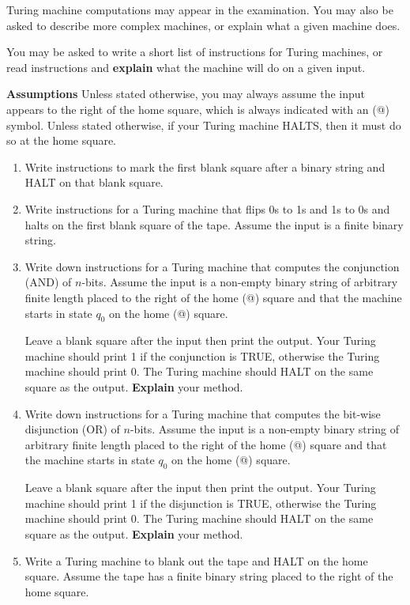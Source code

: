 \documentclass[11pt]{report}
\begin{document}
Turing machine computations may appear in the examination. You may also be asked to describe more complex machines, or explain what a given machine does. 

\vspace{0.3cm}

You may be asked to write a short list of instructions for Turing machines, or read instructions and {\bf explain} what the machine will do on a given input. 

\vspace{0.3cm}
{\bf Assumptions} Unless stated otherwise, you may always assume the input appears to the right of the home square, which is always indicated with an (@) symbol. Unless stated otherwise, if your Turing machine HALTS, then it must do so at the home square. 

\begin{enumerate}
	\item Write instructions to mark the first blank square after a binary string and HALT on that blank square.
	
	\item Write instructions for a Turing machine that flips 0s to 1s and 1s to 0s and halts on the first blank square of the tape. Assume the input is a finite binary string.
	
	\item Write down instructions for a Turing machine that computes the conjunction (AND) of $n$-bits. Assume the input is a non-empty binary string of arbitrary finite length placed to the right of the home (@) square and that the machine starts in state $q_{0}$ on the home (@) square.
		
	\vspace{0.1cm}

	Leave a blank square after the input then print the output. Your Turing machine should print 1 if the conjunction is TRUE, otherwise the Turing machine should print 0. The Turing machine should HALT on the same square as the output. {\bf Explain} your method.
	
	\item Write down instructions for a Turing machine that computes the bit-wise disjunction (OR) of $n$-bits. Assume the input is a non-empty binary string of arbitrary finite length placed to the right of the home (@) square and that the machine starts in state $q_{0}$ on the home (@) square.
		
	\vspace{0.1cm}

	Leave a blank square after the input then print the output. Your Turing machine should print 1 if the disjunction is TRUE, otherwise the Turing machine should print 0. The Turing machine should HALT on the same square as the output. {\bf Explain} your method.
	
	\item Write a Turing machine to blank out the tape and HALT on the home square. Assume the tape has a finite binary string placed to the right of the home square.
\end{enumerate}
\end{document}
